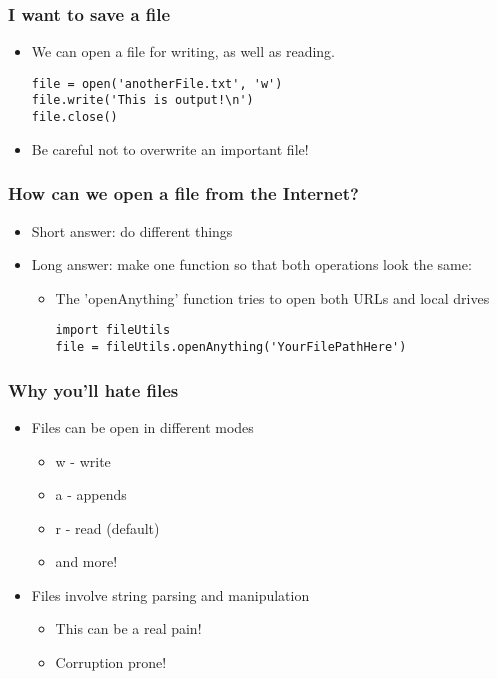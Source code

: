 \documentclass{beamer}
\begin{document}
\begin{frame}[fragile]
\frametitle{I want to save a file}
\begin{itemize}
\item We can open a file for writing, as well as reading.
  \begin{lstlisting}
file = open('anotherFile.txt', 'w')
file.write('This is output!\n')
file.close() 
  \end{lstlisting}
\item Be careful not to overwrite an important file!
\end{itemize}
\end{frame}

\begin{frame}[fragile]
\frametitle{How can we open a file from the Internet?}
\begin{itemize}
\item Short answer: do different things
\item Long answer: make one function so that both operations look the same:
  \begin{itemize}
\item The 'openAnything' function tries to open both URLs and local drives
\begin{lstlisting}
import fileUtils
file = fileUtils.openAnything('YourFilePathHere')
\end{lstlisting}
  \end{itemize}
\end{itemize}
\end{frame}

\begin{frame}[fragile]
\frametitle{Why you'll hate files}
\begin{itemize}
\item Files can be open in different modes
\begin{itemize}
\item w - write
\item a - appends
\item r - read (default)
\item and more!
\end{itemize}
\item Files involve string parsing and manipulation
\begin{itemize}
\item This can be a real pain!
\item Corruption prone!
\end{itemize}
\end{itemize} 
\end{frame}
\end{document}
